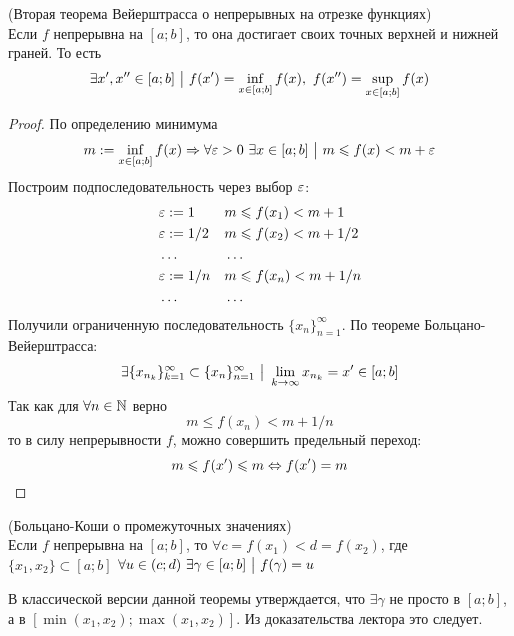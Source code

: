 \begin{theorem} (Вторая теорема Вейерштрасса о непрерывных на отрезке функциях) \\
	Если $f$ непрерывна на $[a; b]$, то она достигает своих точных верхней и нижней граней. То есть
	$$
		\exists x', x'' \in [a; b] \ \big|\  f(x') = \inf\limits_{x \in [a; b]} f(x),\ f(x'') = \sup\limits_{x \in [a; b]} f(x)
	$$
\end{theorem}

\begin{proof}
	По определению минимума
	$$
		m := \inf\limits_{x \in [a; b]} f(x) \Rightarrow \forall \varepsilon > 0\ \exists x \in [a; b] \ \big|\  m \leqslant f(x) < m + \varepsilon
	$$
	Построим подпоследовательность через выбор $\varepsilon$:
	\begin{align*}
		&\varepsilon := 1 & &m \leqslant f(x_1) < m + 1
		\\
		&\varepsilon := 1/2 & &m \leqslant f(x_2) < m + 1/2
		\\
		&\dots & &\dots
		\\
		&\varepsilon := 1/n & &m \leqslant f(x_n) < m + 1/n
		\\
		&\dots & &\dots
	\end{align*}
	Получили ограниченную последовательность $\{x_n\}_{n = 1}^\infty$. По теореме Больцано-Вейерштрасса:
	$$
		\exists \{x_{n_k}\}_{k = 1}^\infty \subset \{x_n\}_{n = 1}^\infty \ \big|\  \lim\limits_{k \to \infty} x_{n_k} = x' \in [a; b] 
	$$
	Так как для $\forall n \in \mathbb{N}$ верно
	$$
		m \le f(x_n) < m + 1/n
	$$
	то в силу непрерывности $f$, можно совершить предельный переход:
	$$
		m \leqslant f(x') \leqslant m \Leftrightarrow f(x') = m
	$$
\end{proof}

\begin{theorem} (Больцано-Коши о промежуточных значениях) \\
	Если $f$ непрерывна на $[a; b]$, то $\forall c = f(x_1) < d = f(x_2)$, где $\{x_1, x_2\} \subset [a; b]$ $\forall u \in (c; d)\ \exists \gamma \in [a; b] \ \big|\  f(\gamma) = u$
\end{theorem}

\begin{anote}
	В классической версии данной теоремы утверждается, что $\exists \gamma$ не просто в $[a; b]$, а в $[\min(x_1, x_2); \max(x_1, x_2)]$. Из доказательства лектора это следует.
\end{anote}

